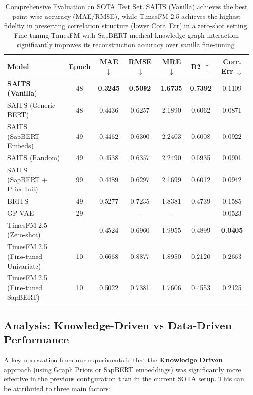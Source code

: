 \begin{table}[h]
\centering
\begin{tabular}{lcccccc}
\toprule
\textbf{Model} & \textbf{Epoch} & \textbf{MAE} $\downarrow$ & \textbf{RMSE} $\downarrow$ & \textbf{MRE} $\downarrow$ & \textbf{R2} $\uparrow$ & \textbf{Corr. Err} $\downarrow$ \\
\midrule
\textbf{SAITS (Vanilla)} & 48 & \textbf{0.3245} & \textbf{0.5092} & \textbf{1.6735} & \textbf{0.7392} & 0.1109 \\
SAITS (Generic BERT) & 48 & 0.4436 & 0.6257 & 2.1890 & 0.6062 & 0.0871 \\
SAITS (SapBERT Embeds) & 49 & 0.4462 & 0.6300 & 2.2403 & 0.6008 & 0.0922 \\
SAITS (Random) & 49 & 0.4538 & 0.6357 & 2.2490 & 0.5935 & 0.0901 \\
SAITS (SapBERT + Prior Init) & 99 & 0.4489 & 0.6297 & 2.1699 & 0.6012 & 0.0942 \\
BRITS & 49 & 0.5277 & 0.7235 & 1.8381 & 0.4739 & 0.1585 \\
GP-VAE & 29 & - & - & - & - & 0.0523 \\
TimesFM 2.5 (Zero-shot) & - & 0.4524 & 0.6960 & 1.9955 & 0.4899 & \textbf{0.0405} \\
TimesFM 2.5 (Fine-tuned Univariate) & 10 & 0.6668 & 0.8877 & 1.8950 & 0.2120 & 0.2663 \\
TimesFM 2.5 (Fine-tuned SapBERT) & 10 & 0.5022 & 0.7381 & 1.7606 & 0.4553 & 0.2125 \\
\bottomrule
\end{tabular}
\caption{Comprehensive Evaluation on SOTA Test Set. SAITS (Vanilla) achieves the best point-wise accuracy (MAE/RMSE), while TimesFM 2.5 achieves the highest fidelity in preserving correlation structure (lower Corr. Err) in a zero-shot setting. Fine-tuning TimesFM with SapBERT medical knowledge graph interaction significantly improves its reconstruction accuracy over vanilla fine-tuning.}
\label{tab:results}
\end{table}

\subsection{Analysis: Knowledge-Driven vs Data-Driven Performance}
A key observation from our experiments is that the \textbf{Knowledge-Driven} approach (using Graph Priors or SapBERT embeddings) was significantly more effective in the previous configuration than in the current SOTA setup. This can be attributed to three main factors:

